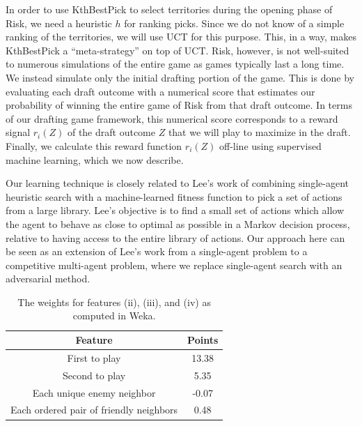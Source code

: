 \documentclass[letterpaper]{article}
\numberwithin{equation}{section}
\numberwithin{theorem}{section}
\numberwithin{lemma}{section}
\numberwithin{df}{section}
\begin{document}
In order to use KthBestPick to select territories during the opening phase of Risk, we need a heuristic $h$ for ranking picks.  Since we do not know of a simple ranking of the territories, we will use UCT for this purpose.  This, in a way, makes KthBestPick a ``meta-strategy'' on top of UCT.  Risk, however, is not well-suited to numerous simulations of the entire game as games typically last a long time.  We instead simulate only the initial drafting portion of the game.  This is done by evaluating each draft outcome with a numerical score that estimates our probability of winning the entire game of Risk from that draft outcome.  In terms of our drafting game framework, this numerical score corresponds to a reward signal $r_i(Z)$ of the draft outcome $Z$ that we will play to maximize in the draft.  Finally, we calculate this reward function $r_i(Z)$ off-line using supervised machine learning, which we now describe.

Our learning technique is closely related to Lee's work \cite{GregLeeThesis} of combining single-agent heuristic search with a machine-learned fitness function to pick a set of actions from a large library.  Lee's objective is to find a small set of actions which allow the agent to behave as close to optimal as possible in a Markov decision process, relative to having access to the entire library of actions.  Our approach here can be seen as an extension of Lee's work from a single-agent problem to a competitive multi-agent problem, where we replace single-agent search with an adversarial method. 

\begin{table}[t]
	\centering
		\caption{The weights for features (ii), (iii), and (iv) as computed in Weka.} 
		\label{tab:MoreScoring}
		\begin{footnotesize}
		\begin{tabular}{|c|c|}
			\hline
			\textbf{Feature} & \textbf{Points} \\
			\hline
			First to play & 13.38 \\
			\hline
			Second to play & 5.35 \\
			\hline
			Each unique enemy neighbor & -0.07 \\
			\hline
			Each ordered pair of friendly neighbors & 0.48 \\
			\hline
		\end{tabular}
		\end{footnotesize}
	
\end{table}
\end{document}
